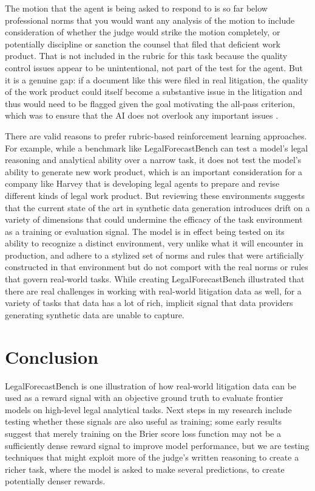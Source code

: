 \documentclass[11pt]{article}
\begin{document}
The motion that the agent is being asked to respond to is so far below professional norms that you would want any analysis of the motion to include consideration of whether the judge would strike the motion completely, or potentially discipline or sanction the counsel that filed that deficient work product. That is not included in the rubric for this task because the quality control issues appear to be unintentional, not part of the test for the agent. But it is a genuine gap: if a document like this were filed in real litigation, the quality of the work product could itself become a substantive issue in the litigation and thus would need to be flagged given the goal motivating the all-pass criterion, which was to ensure that the AI does not overlook any important issues \citep[section ``Evaluating a task'']{harveyLAB}.

There are valid reasons to prefer rubric-based reinforcement learning approaches. For example, while a benchmark like LegalForecastBench can test a model's legal reasoning and analytical ability over a narrow task, it does not test the model's ability to generate new work product, which is an important consideration for a company like Harvey that is developing legal agents to prepare and revise different kinds of legal work product. But reviewing these environments suggests that the current state of the art in synthetic data generation introduces drift on a variety of dimensions that could undermine the efficacy of the task environment as a training or evaluation signal. The model is in effect being tested on its ability to recognize a distinct environment, very unlike what it will encounter in production, and adhere to a stylized set of norms and rules that were artificially constructed in that environment but do not comport with the real norms or rules that govern real-world tasks. While creating LegalForecastBench illustrated that there are real challenges in working with real-world litigation data as well, for a variety of tasks that data has a lot of rich, implicit signal that data providers generating synthetic data are unable to capture.

\section{Conclusion}

LegalForecastBench is one illustration of how real-world litigation data can be used as a reward signal with an objective ground truth to evaluate frontier models on high-level legal analytical tasks. Next steps in my research include testing whether these signals are also useful as training; some early results suggest that merely training on the Brier score loss function may not be a sufficiently dense reward signal to improve model performance, but we are testing techniques that might exploit more of the judge's written reasoning to create a richer task, where the model is asked to make several predictions, to create potentially denser rewards.
\end{document}
